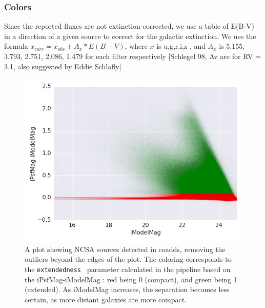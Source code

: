 \documentclass[fleqn,usenatbib]{mnras}  %
\begin{document}
%
% 



\subsubsection{Colors}
%
%


%
%


%
%

Since the reported fluxes are not extinction-corrected, we use a table of E(B-V) in a direction of a given source to correct for the galactic extinction. We use the formula  $x_{corr}  = x_{obs} + A_{x} * E(B-V)$, where $x$ is  u,g,r,i,z , and $A_x$ is 5.155, 3.793, 2.751, 2.086, 1.479  for each filter respectively  [Schlegel 98, Av are for RV = 3.1, also suggested by Eddie Schlafly] 




\begin{figure}
\label{fig:coadds_ext}
 \includegraphics[width=\columnwidth]{Extendedness_coadd_data_16520093_srcs_lim.png}
 \cprotect\caption{A plot showing NCSA sources detected in coadds, removing the outliers beyond the edges of the plot. The coloring corresponds to the \verb|extendedness | parameter calculated in the pipeline based on the iPsfMag-iModelMag : red being 0 (compact), and green being 1 (extended). As iModelMag increases, the separation becomes less certain, as more distant galaxies are more compact.  }
\end{figure}
% 
\end{document}
